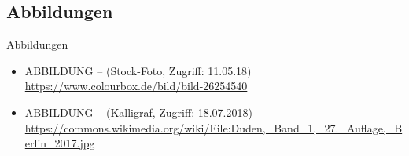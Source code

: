 \subsection{Abbildungen}


\begin{frame}{Abbildungen}
\small

\begin{itemize}
	\item ABBILDUNG --  (Stock-Foto, Zugriff: 11.05.18)
	\url{https://www.colourbox.de/bild/bild-26254540}
	\item ABBILDUNG --  (Kalligraf, Zugriff: 18.07.2018) \url{https://commons.wikimedia.org/wiki/File:Duden,_Band_1,_27._Auflage,_Berlin_2017.jpg}
\end{itemize}	

\end{frame}

